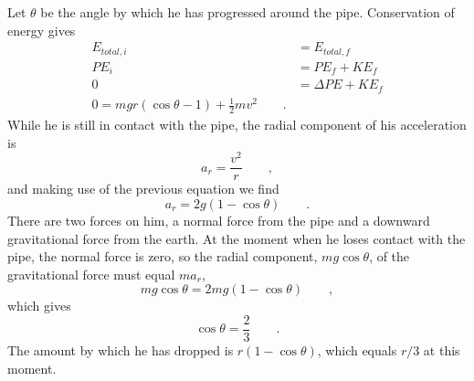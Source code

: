 Let $\theta$ be the angle by which he has
progressed around the pipe. Conservation of energy gives
\begin{align*}
		E_{total,i}	 &=    E_{total,f}  \\
         	PE_i		 &=    PE_f+ KE_f   \\
         	0		 &=    \Delta PE+ KE_f  \\
		0		 =    mgr(\cos  \theta -1) +  \frac{1}{2}mv^2  \qquad   .  
\end{align*}
While he is still in contact with the pipe, the radial
component of his acceleration is
\begin{equation*}
		a_r		 =    \frac{v^2}{r}  \qquad ,  
\end{equation*}
and making use of the previous equation we find
\begin{equation*}
		a_r		 =    2g(1-\cos  \theta )   \qquad   .  
\end{equation*}
There are two forces on him, a normal force from the pipe
and a downward gravitational force from the earth. At the
moment when he loses contact with the pipe, the normal
force is zero, so the radial component, 
$mg \cos\theta$, of the gravitational force must equal $ma_r$,
\begin{equation*}
  mg \cos  \theta = 2mg(1-\cos\theta)   \qquad   ,  
\end{equation*}
which gives
\begin{equation*}
		\cos  \theta 	 =    \frac{2}{3}   \qquad   .  
\end{equation*}
The amount by which he has dropped is $r(1-\cos\theta)$,
which equals $r/3$ at this moment.
